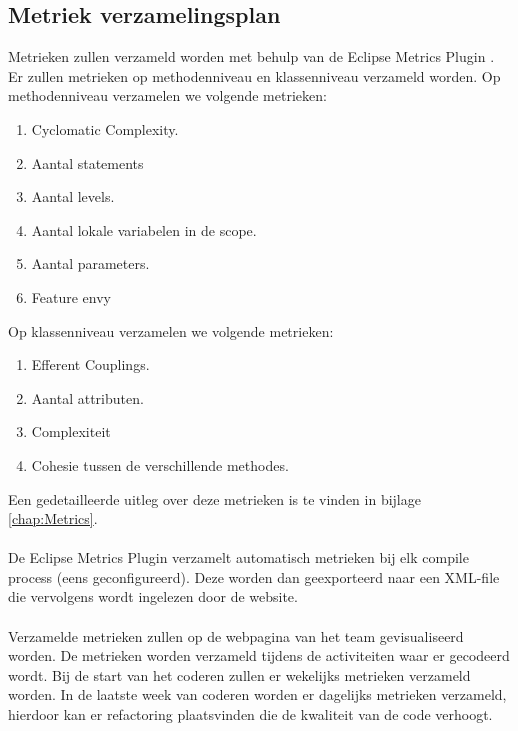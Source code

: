 \subsection{Metriek verzamelingsplan} \label{sec:Metrics}
Metrieken zullen verzameld worden met behulp van de Eclipse Metrics Plugin \cite{EclipseMetricsPlugin}. Er zullen metrieken op methodenniveau en klassenniveau verzameld worden. Op methodenniveau verzamelen we volgende metrieken:
\begin{enumerate}
	\item Cyclomatic Complexity.
	\item Aantal statements
	\item Aantal levels.
	\item Aantal lokale variabelen in de scope.
	\item Aantal parameters.
	\item Feature envy
\end{enumerate}
Op klassenniveau verzamelen we volgende metrieken:
\begin{enumerate}
	\item Efferent Couplings.
	\item Aantal attributen.
	\item Complexiteit
	\item Cohesie tussen de verschillende methodes.
\end{enumerate}
Een gedetailleerde uitleg over deze metrieken is te vinden in bijlage \ref{chap:Metrics}.
\\
\\
De Eclipse Metrics Plugin verzamelt automatisch metrieken bij elk compile process (eens geconfigureerd). Deze worden dan geexporteerd naar een XML-file die vervolgens wordt ingelezen door de website.
\\
\\
Verzamelde metrieken zullen op de webpagina van het team gevisualiseerd worden. De metrieken worden verzameld tijdens de activiteiten waar er gecodeerd wordt. Bij de start van het coderen zullen er wekelijks metrieken verzameld worden. In de laatste week van coderen worden er dagelijks metrieken verzameld, hierdoor kan er refactoring plaatsvinden die de kwaliteit van de code verhoogt.

